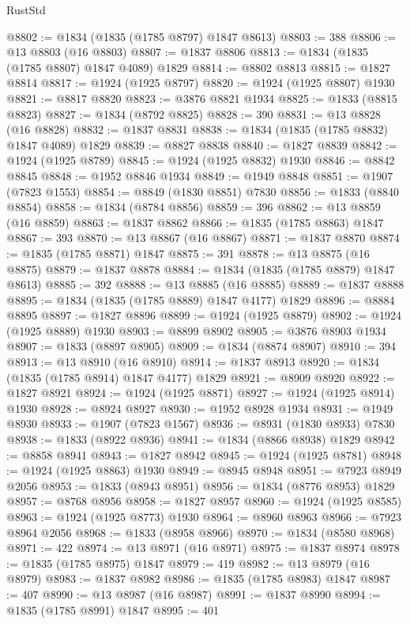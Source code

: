 \begin{lexlean}{RustStd}
\begin{coremodule}
@8802 := @1834 (@1835 (@1785 @8797) @1847 @8613)
@8803 := 388
@8806 := @13 @8803 (@16 @8803)
@8807 := @1837 @8806
@8813 := @1834 (@1835 (@1785 @8807) @1847 @4089) @1829
@8814 := @8802 @8813
@8815 := @1827 @8814
@8817 := @1924 (@1925 @8797)
@8820 := @1924 (@1925 @8807) @1930
@8821 := @8817 @8820
@8823 := @3876 @8821 @1934
@8825 := @1833 (@8815 @8823)
@8827 := @1834 (@8792 @8825)
@8828 := 390
@8831 := @13 @8828 (@16 @8828)
@8832 := @1837 @8831
@8838 := @1834 (@1835 (@1785 @8832) @1847 @4089) @1829
@8839 := @8827 @8838
@8840 := @1827 @8839
@8842 := @1924 (@1925 @8789)
@8845 := @1924 (@1925 @8832) @1930
@8846 := @8842 @8845
@8848 := @1952 @8846 @1934
@8849 := @1949 @8848
@8851 := @1907 (@7823 @1553)
@8854 := @8849 (@1830 @8851) @7830
@8856 := @1833 (@8840 @8854)
@8858 := @1834 (@8784 @8856)
@8859 := 396
@8862 := @13 @8859 (@16 @8859)
@8863 := @1837 @8862
@8866 := @1835 (@1785 @8863) @1847
@8867 := 393
@8870 := @13 @8867 (@16 @8867)
@8871 := @1837 @8870
@8874 := @1835 (@1785 @8871) @1847
@8875 := 391
@8878 := @13 @8875 (@16 @8875)
@8879 := @1837 @8878
@8884 := @1834 (@1835 (@1785 @8879) @1847 @8613)
@8885 := 392
@8888 := @13 @8885 (@16 @8885)
@8889 := @1837 @8888
@8895 := @1834 (@1835 (@1785 @8889) @1847 @4177) @1829
@8896 := @8884 @8895
@8897 := @1827 @8896
@8899 := @1924 (@1925 @8879)
@8902 := @1924 (@1925 @8889) @1930
@8903 := @8899 @8902
@8905 := @3876 @8903 @1934
@8907 := @1833 (@8897 @8905)
@8909 := @1834 (@8874 @8907)
@8910 := 394
@8913 := @13 @8910 (@16 @8910)
@8914 := @1837 @8913
@8920 := @1834 (@1835 (@1785 @8914) @1847 @4177) @1829
@8921 := @8909 @8920
@8922 := @1827 @8921
@8924 := @1924 (@1925 @8871)
@8927 := @1924 (@1925 @8914) @1930
@8928 := @8924 @8927
@8930 := @1952 @8928 @1934
@8931 := @1949 @8930
@8933 := @1907 (@7823 @1567)
@8936 := @8931 (@1830 @8933) @7830
@8938 := @1833 (@8922 @8936)
@8941 := @1834 (@8866 @8938) @1829
@8942 := @8858 @8941
@8943 := @1827 @8942
@8945 := @1924 (@1925 @8781)
@8948 := @1924 (@1925 @8863) @1930
@8949 := @8945 @8948
@8951 := @7923 @8949 @2056
@8953 := @1833 (@8943 @8951)
@8956 := @1834 (@8776 @8953) @1829
@8957 := @8768 @8956
@8958 := @1827 @8957
@8960 := @1924 (@1925 @8585)
@8963 := @1924 (@1925 @8773) @1930
@8964 := @8960 @8963
@8966 := @7923 @8964 @2056
@8968 := @1833 (@8958 @8966)
@8970 := @1834 (@8580 @8968)
@8971 := 422
@8974 := @13 @8971 (@16 @8971)
@8975 := @1837 @8974
@8978 := @1835 (@1785 @8975) @1847
@8979 := 419
@8982 := @13 @8979 (@16 @8979)
@8983 := @1837 @8982
@8986 := @1835 (@1785 @8983) @1847
@8987 := 407
@8990 := @13 @8987 (@16 @8987)
@8991 := @1837 @8990
@8994 := @1835 (@1785 @8991) @1847
@8995 := 401

\end{coremodule}
\end{lexlean}
